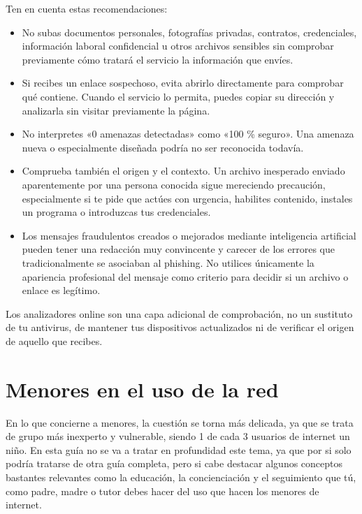 \documentclass[
  spanish,
  a4paper,
  openany]{book}
\begin{document}
Ten en cuenta estas recomendaciones:

\begin{itemize}
\item
  No subas documentos personales, fotografías privadas, contratos, credenciales, información laboral confidencial u otros archivos sensibles sin comprobar previamente cómo tratará el servicio la información que envíes.
\item
  Si recibes un enlace sospechoso, evita abrirlo directamente para comprobar qué contiene. Cuando el servicio lo permita, puedes copiar su dirección y analizarla sin visitar previamente la página.
\item
  No interpretes «0 amenazas detectadas» como «100 \% seguro». Una amenaza nueva o especialmente diseñada podría no ser reconocida todavía.
\item
  Comprueba también el origen y el contexto. Un archivo inesperado enviado aparentemente por una persona conocida sigue mereciendo precaución, especialmente si te pide que actúes con urgencia, habilites contenido, instales un programa o introduzcas tus credenciales.
\item
  Los mensajes fraudulentos creados o mejorados mediante inteligencia artificial pueden tener una redacción muy convincente y carecer de los errores que tradicionalmente se asociaban al phishing. No utilices únicamente la apariencia profesional del mensaje como criterio para decidir si un archivo o enlace es legítimo.
\end{itemize}

Los analizadores online son una capa adicional de comprobación, no un sustituto de tu antivirus, de mantener tus dispositivos actualizados ni de verificar el origen de aquello que recibes.

\section{Menores en el uso de la red}\label{menores-en-el-uso-de-la-red}

En lo que concierne a menores, la cuestión se torna más delicada, ya que se trata de grupo más inexperto y vulnerable, siendo 1 de cada 3 usuarios de internet un niño. En esta guía no se va a tratar en profundidad este tema, ya que por si solo podría tratarse de otra guía completa, pero si cabe destacar algunos conceptos bastantes relevantes como la educación, la concienciación y el seguimiento que tú, como padre, madre o tutor debes hacer del uso que hacen los menores de internet.
\end{document}

